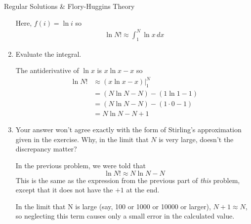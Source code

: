 \begin{activity}{Regular Solutions \& Flory-Huggins Theory}
\begin{exercises}
\begin{enumerate}
					\begin{solution}{}
						Here, $f(i) = \ln i$ so
						\begin{align*}
							\ln N! \approx \int_1^N \ln x\,dx 
						\end{align*}
					\end{solution}
					
				\item Evaluate the integral.
				
					\begin{solution}{}
						The antiderivative of $\ln x$ is $x \ln x - x$ so
						\begin{align*}
							\ln N! &\approx (x \ln x - x)|_1^N \\
								&= (N \ln N - N) - (1 \ln 1 - 1) \\
								&= (N \ln N - N) - (1 \cdot 0 - 1) \\
								&= N \ln N - N + 1
						\end{align*}
					\end{solution}
					
				\item Your answer won't agree exactly with the form of Stirling's approximation given in the exercise.  Why, in the limit that $N$ is very large, doesn't the discrepancy matter?
				
					\begin{solution}{}
						In the previous problem, we were told that
						\begin{equation*}
							\ln N! \approx N \ln N - N
						\end{equation*}
						This is the same as the expression from the previous part of \emph{this} problem, except that it does not have the $+1$ at the end.
						
						In the limit that N is large (say, 100 or 1000 or 10000 or larger), $N+1 \approx N$, so neglecting this term causes only a small error in the calculated value.
					\end{solution}
					
			\end{enumerate}
					
\end{exercises}
	
\end{activity}
